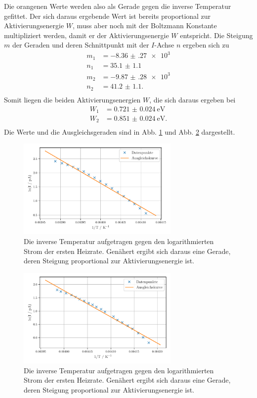 Die orangenen Werte werden also als Gerade gegen die inverse Temperatur gefittet. Der sich daraus ergebende Wert ist bereits proportional zur Aktivierungsenergie $W$, muss aber noch mit der Boltzmann Konstante multipliziert werden, damit er der Aktivierungsenergie $W$ entspricht. Die Steigung $m$ der Geraden und deren Schnittpunkt mit der $I$-Achse $n$ ergeben sich zu 
\begin{align*}
     m_{1} &= \num{-8.36(27)e3} \\
     n_{1} &= \num{35.1(11)} \\
     m_{2} &= \num{-9.87(28)e3} \\
     n_{2} &= \num{41.2(11)}. \\
\end{align*}
Somit liegen die beiden Aktivierungsenergien $W$, die sich daraus ergeben bei 
\begin{align*}
    W_{1} &= \SI{0.721(24)}{\electronvolt} \\
    W_{2} &= \SI{0.851(24)}{\electronvolt}. \\
\end{align*}
Die Werte und die Ausgleichsgeraden sind in Abb. \ref{abb:anlauf1} und Abb. \ref{abb:anlauf2} dargestellt. 

\begin{figure}
    \centering
    \includegraphics[width=0.7\textwidth]{figures/anlauf1.pdf}
    \caption{Die inverse Temperatur aufgetragen gegen den logarithmierten Strom der ersten Heizrate. Genähert ergibt sich daraus eine Gerade, deren Steigung proportional zur Aktivierungsenergie ist.}
    \label{abb:anlauf1}
\end{figure}

\begin{figure}
    \centering
    \includegraphics[width=0.7\textwidth]{figures/anlauf2.pdf}
    \caption{Die inverse Temperatur aufgetragen gegen den logarithmierten Strom der ersten Heizrate. Genähert ergibt sich daraus eine Gerade, deren Steigung proportional zur Aktivierungsenergie ist.}
    \label{abb:anlauf2}
\end{figure}

